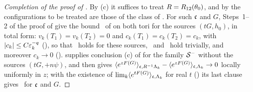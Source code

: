 \begin{proof}[Completion of the proof of ]
By (c) it suffices to treat $R=R_{12}(\theta_0)$, and by  the configurations to be treated are those of the class of . For such $\mathfrak c$ and $G$, Steps~1--2 of the proof of  give the bound \hypF\ of  on both tori for the sources $(tG,h_0)$, in total form: $v_k(T_1)=v_k(T_2)=0$ and $c_k(T_1)=c_k(T_2)=c_k$, with $|c_k|\le C\varepsilon_k^{-q}$ (), so that \hypFz\ holds for these sources, \hypV\ and \hypCc\ hold trivially, and moreover $c_k\to0$ ().  supplies conclusion (c) of  for the family $\mathcal S^-$ without the sources $(tG,+n\psi)$, and  then gives $\langle e^{zF(G)}\rangle_{\mathfrak c,R^{-1}\Lambda_k}-\langle e^{zF(G)}\rangle_{\mathfrak c,\Lambda_k}\to0$ locally uniformly in $z$; with the existence of $\lim_k\langle e^{tF(G)}\rangle_{\mathfrak c,\Lambda_k}$ for real $t$ () its last clause gives \Kz\ for $\mathfrak c$ and $G$.
\end{proof}
